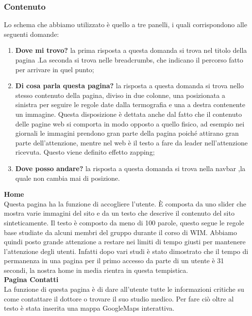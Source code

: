 \subsubsection{Contenuto}
Lo schema che abbiamo utilizzato è quello a tre panelli, i quali corrispondono alle seguenti domande:
\begin{enumerate}
\item \textbf{Dove mi trovo?} la prima risposta a questa domanda si trova nel titolo della pagina .La seconda si trova nelle breadcrumbs, che indicano il percorso fatto per arrivare in quel punto;
\item \textbf{Di cosa parla questa pagina?} la risposta a questa domanda si trova nello stesso contenuto della pagina, diviso in due colonne, una posizionata a sinistra per seguire le regole date dalla termografia e una a destra contenente un immagine. Questa disposizione è dettata anche dal fatto che il contenuto delle pagine web si comporta in modo opposto a quello fisico, ad esempio nei giornali le immagini prendono gran parte della pagina poiché attirano gran parte dell’attenzione, mentre nel web è il testo a fare da leader nell’attenzione ricevuta. Questo viene definito effetto zapping;
\item \textbf{Dove posso andare?} la risposta a questa domanda si trova nella navbar ,la quale non cambia mai di posizione. \\
\end{enumerate}


\textbf{Home} \\ 
Questa pagina ha la funzione di accogliere l’utente. È composta da uno slider che mostra varie immagini del sito e da un testo che descrive il contenuto del sito sinteticamente.
Il testo è composto da meno di 100 parole, questo segue le regole base studiate da alcuni membri del gruppo durante il corso di WIM. Abbiamo quindi posto grande attenzione a restare nei limiti di tempo giusti per mantenere l’attenzione degli utenti.
Infatti dopo vari studi è stato dimostrato che il tempo di permanenza in una pagina per il primo accesso da parte di un utente è 31 secondi, la nostra home in media rientra in questa tempistica. \\

\textbf{Pagina Contatti} \\ 
La funzione di questa pagina è di dare all’utente tutte le informazioni critiche su come contattare il dottore o trovare il suo studio medico.
Per fare ciò oltre al testo è stata inserita una mappa GoogleMaps interattiva. \\


